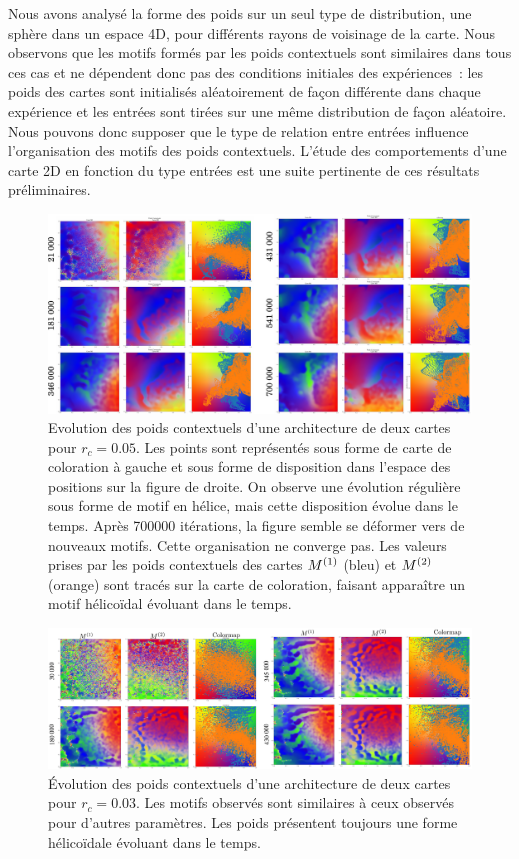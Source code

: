 \documentclass[../main]{subfiles}
\begin{document}
Nous avons analysé la forme des poids sur un seul type de distribution, une sphère dans un espace 4D, pour différents rayons de voisinage de la carte.
Nous observons que les motifs formés par les poids contextuels sont similaires dans tous ces cas et ne dépendent donc pas des conditions initiales des expériences~: les poids des cartes sont initialisés aléatoirement de façon différente dans chaque expérience et les entrées sont tirées sur une même distribution de façon aléatoire.
Nous pouvons donc supposer que le type de relation entre entrées influence l'organisation des motifs des poids contextuels. L'étude des comportements d'une carte 2D en fonction du type entrées est une suite pertinente de ces résultats préliminaires.


\begin{figure}
	\includegraphics[width=\textwidth]{sphere_rc005_evol_landscape}
	\caption{Evolution des poids contextuels d'une architecture de deux cartes pour $r_c =0.05$. Les points sont représentés sous forme de carte de coloration à gauche et sous forme de disposition dans l'espace des positions sur la figure de droite. On observe une évolution régulière sous forme de motif en hélice, mais cette disposition évolue dans le temps. Après 700000 itérations, la figure semble se déformer vers de nouveaux motifs. Cette organisation ne converge pas. Les valeurs prises par les poids contextuels des cartes $M^{({1})}$ (bleu) et $M^{({2})}$ (orange) sont tracés sur la carte de coloration, faisant apparaître un motif hélicoïdal évoluant dans le temps.
	\label{fig:rc_005}}
\end{figure}


\begin{figure}
	\includegraphics[width=\textwidth]{wc_rc003_evol.pdf}
	\caption{\'Evolution des poids contextuels d'une architecture de deux cartes pour $r_c =0.03$. Les motifs observés sont similaires à ceux observés pour d'autres paramètres. Les poids présentent toujours une forme hélicoïdale évoluant dans le temps.\label{fig:rc_003}}
\end{figure}
\end{document}
